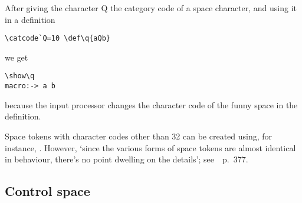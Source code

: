 \documentclass{book}
\begin{document}
\begin{example} After giving the character \n Q 
the category code of a space character, 
and using it in a definition
\begin{verbatim}
\catcode`Q=10 \def\q{aQb}
\end{verbatim}
we get
\begin{verbatim}
\show\q
macro:-> a b
\end{verbatim}
because the input processor
changes the character code of the funny space
in the definition.
\end{example}

Space tokens with character codes other than 32 can be
created using, for instance, .
However, `since the various forms of
space tokens are almost identical in behaviour, there's no
point dwelling on the details'; see~\cite{Knuth:TeXbook}~p.~377.


\subsection{Control space}
\end{document}
